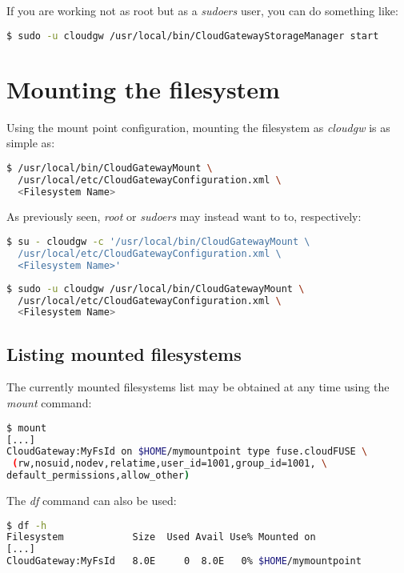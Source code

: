 \documentclass[11pt,fleqn,openany]{book} %
\begin{document}
If you are working not as root but as a \textit{sudoers} user, you can do something like:\\
\begin{lstlisting}[language=bash]
$ sudo -u cloudgw /usr/local/bin/CloudGatewayStorageManager start
\end{lstlisting}

\section{Mounting the filesystem}
\label{sec:mounting-the-filesystem}

Using the mount point configuration, mounting the filesystem as \textit{cloudgw} is as simple as:\\
\begin{lstlisting}[language=bash]
$ /usr/local/bin/CloudGatewayMount \
  /usr/local/etc/CloudGatewayConfiguration.xml \
  <Filesystem Name>
\end{lstlisting}

As previously seen, \textit{root} or \textit{sudoers} may instead want to to, respectively:\\

\begin{lstlisting}[language=bash]
$ su - cloudgw -c '/usr/local/bin/CloudGatewayMount \
  /usr/local/etc/CloudGatewayConfiguration.xml \
  <Filesystem Name>'
\end{lstlisting}

\begin{lstlisting}[language=bash]
$ sudo -u cloudgw /usr/local/bin/CloudGatewayMount \
  /usr/local/etc/CloudGatewayConfiguration.xml \
  <Filesystem Name>
\end{lstlisting}

\subsection{Listing mounted filesystems}

The currently mounted filesystems list may be obtained at any time using the \textit{mount} command:\\
\begin{lstlisting}[language=bash]
$ mount
[...]
CloudGateway:MyFsId on $HOME/mymountpoint type fuse.cloudFUSE \
 (rw,nosuid,nodev,relatime,user_id=1001,group_id=1001, \
default_permissions,allow_other)
\end{lstlisting}

The \textit{df} command can also be used:\\
\begin{lstlisting}[language=bash]
$ df -h
Filesystem            Size  Used Avail Use% Mounted on
[...]
CloudGateway:MyFsId   8.0E     0  8.0E   0% $HOME/mymountpoint
\end{lstlisting}
\end{document}
